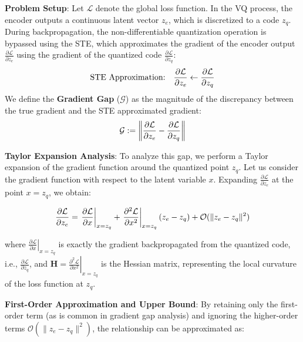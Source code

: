 \textbf{Problem Setup}: Let $\mathcal{L}$ denote the global loss function. In the VQ process, the encoder outputs a continuous latent vector $z_e$, which is discretized to a code $z_q$. 
During backpropagation, the non-differentiable quantization operation is bypassed using the STE, which approximates the gradient of the encoder output $\frac{\partial \mathcal{L}}{\partial z_e}$ using the gradient of the quantized code $\frac{\partial \mathcal{L}}{\partial z_q}$:
\begin{equation}
    \text{STE Approximation:} \quad \frac{\partial \mathcal{L}}{\partial z_e} \leftarrow \frac{\partial \mathcal{L}}{\partial z_q}
\vspace{-3pt}
\end{equation}
We define the \textbf{Gradient Gap} ($\mathcal{G}$) as the magnitude of the discrepancy between the true gradient and the STE approximated gradient:
\begin{equation}
    \mathcal{G} \triangleq \left\| \frac{\partial \mathcal{L}}{\partial z_e} - \frac{\partial \mathcal{L}}{\partial z_q} \right\|
\vspace{-3pt}
\end{equation}

\textbf{Taylor Expansion Analysis}: To analyze this gap, we perform a Taylor expansion of the gradient function around the quantized point $z_q$. Let us consider the gradient function with respect to the latent variable $x$. Expanding $\frac{\partial \mathcal{L}}{\partial z_e}$ at the point $x = z_q$, we obtain:

\begin{equation}
    \frac{\partial \mathcal{L}}{\partial z_e} = \left. \frac{\partial \mathcal{L}}{\partial x} \right|_{x=z_q} + \left. \frac{\partial^2 \mathcal{L}}{\partial x^2} \right|_{x=z_q} (z_e - z_q) + \mathcal{O}(\|z_e - z_q\|^2)
    \label{eq:taylor}
\vspace{-3pt}
\end{equation}

where $\left. \frac{\partial \mathcal{L}}{\partial x} \right|_{x=z_q}$ is exactly the gradient backpropagated from the quantized code, i.e., $\frac{\partial \mathcal{L}}{\partial z_q}$, and $\mathbf{H} = \left. \frac{\partial^2 \mathcal{L}}{\partial x^2} \right|_{x=z_q}$ is the Hessian matrix, representing the local curvature of the loss function at $z_q$.

\textbf{First-Order Approximation and Upper Bound}: By retaining only the first-order term (as is common in gradient gap analysis) and ignoring the higher-order terms $\mathcal{O}(\|z_e - z_q\|^2)$, the relationship can be approximated as:

